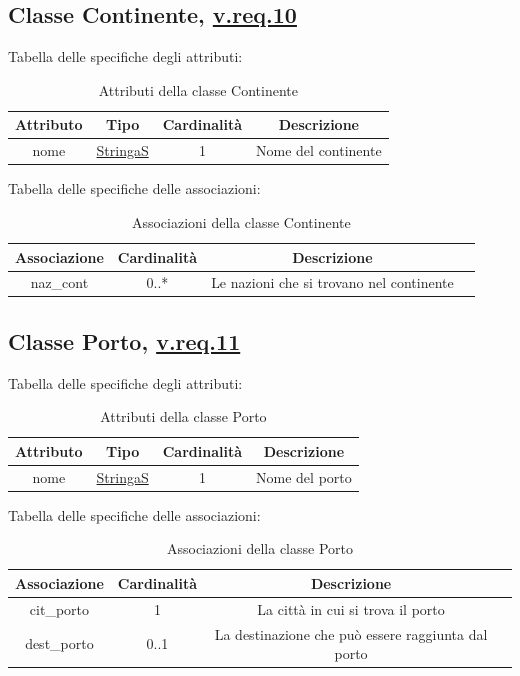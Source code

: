 \documentclass{article}
\begin{document}
\subsection*{Classe Continente, \hyperref[sec:RequisitiContinente]{v.req.10}}\label{sec:Continente}

Tabella delle specifiche degli attributi:
\begin{table}[h!]
    \centering
    \begin{tabular}{|c|c|c|c|}
        \hline
        Attributo & Tipo & Cardinalità & Descrizione \\
        \hline
        nome & \hyperref[sec:StringaS]{StringaS} & 1 & Nome del continente \\
        \hline
    \end{tabular}
    \caption{Attributi della classe Continente}
\end{table}

Tabella delle specifiche delle associazioni:
\begin{table}[h!]
    \centering
    \begin{tabular}{|c|c|c|c|}
        \hline
        Associazione & Cardinalità & Descrizione \\
        \hline
        naz\_cont & 0..* & Le nazioni che si trovano nel continente \\
        \hline
    \end{tabular}
    \caption{Associazioni della classe Continente}
\end{table}

\subsection*{Classe Porto, \hyperref[sec:RequisitiPorto]{v.req.11}}\label{sec:Porto}

Tabella delle specifiche degli attributi:
\begin{table}[h!]
    \centering
    \begin{tabular}{|c|c|c|c|}
        \hline
        Attributo & Tipo & Cardinalità & Descrizione \\
        \hline
        nome & \hyperref[sec:StringaS]{StringaS} & 1 & Nome del porto \\
        \hline
    \end{tabular}
    \caption{Attributi della classe Porto}
\end{table}

Tabella delle specifiche delle associazioni:
\begin{table}[h!]
    \centering
    \begin{tabular}{|c|c|c|c|}
        \hline
        Associazione & Cardinalità & Descrizione \\
        \hline
        cit\_porto & 1 & La città in cui si trova il porto \\
        dest\_porto & 0..1 & La destinazione che può essere raggiunta dal porto \\
        \hline
    \end{tabular}
    \caption{Associazioni della classe Porto}
\end{table}
\end{document}
